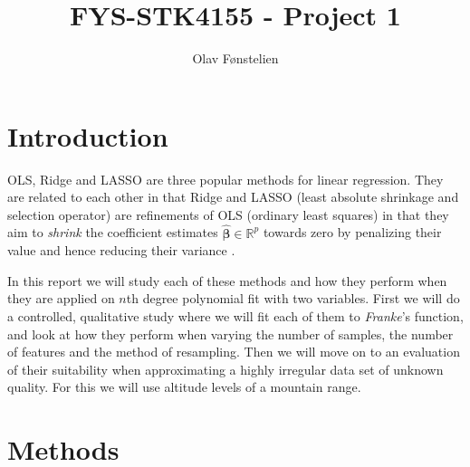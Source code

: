 \documentclass[]{article}
\title{FYS-STK4155 - Project 1}
\author{Olav Fønstelien}
\begin{document}
\maketitle

\begin{abstract}

\end{abstract}

\section{Introduction}
OLS, Ridge and LASSO are three popular methods for linear regression. They are related to each other in that Ridge and LASSO (least absolute shrinkage and selection operator) are refinements of OLS (ordinary least squares) in that they aim to \textit{shrink} the coefficient estimates $\mathbf{\hat{\beta}} \in \mathbb{R}^p$ towards zero by penalizing their value and hence reducing their variance \cite{james2013introduction}.

In this report we will study each of these methods and how they perform when they are applied on $n$th degree polynomial fit with two variables. First we will do a controlled, qualitative study where we will fit each of them to \textit{Franke}'s function, and look at how they perform when varying the number of samples, the number of features and the method of resampling. Then we will move on to an evaluation of their suitability when approximating a highly irregular data set of unknown quality. For this we will use altitude levels of a mountain range. 


\section{Methods}
\end{document}

